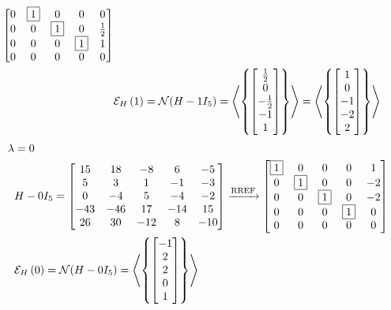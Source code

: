 \documentclass{ximera}
\begin{document}
\begin{example}
\begin{align*}
\begin{bmatrix}
                                          0 & \fbox{1} & 0 & 0 & 0\\
                                          0 & 0 & \fbox{1} & 0 & \frac{1}{2}\\
                                          0 & 0 & 0 & \fbox{1} & 1\\
                                          0 & 0 & 0 & 0 & 0
                                        \end{bmatrix}\\
           &\mathcal{E}_{H}\left(1\right)=\mathcal{N}\!\left(H-1I_5\right)
             =\left\langle\left\{\begin{bmatrix}\frac{1}{2}\\0\\-\frac{1}{2}\\-1\\1\end{bmatrix}\right\}\right\rangle
    =\left\langle\left\{\begin{bmatrix}1\\0\\-1\\-2\\2\end{bmatrix}\right\}\right\rangle
  \end{align*}
  \begin{align*}
    \lambda&=0\\&H-0I_5=
                  \begin{bmatrix}
                    15 & 18 & -8 & 6 & -5\\
                    5 & 3 & 1 & -1 & -3\\
                    0 & -4 & 5 & -4 & -2\\
                    -43 & -46 & 17 & -14 & 15\\
                    26 & 30 & -12 & 8 & -10
                  \end{bmatrix}
                                        \rref
                                        \begin{bmatrix}
                                          \leading{1} & 0 & 0 & 0 & 1\\
                                          0 & \leading{1} & 0 & 0 & -2\\
                                          0 & 0 & \leading{1} & 0 & -2\\
                                          0 & 0 & 0 & \leading{1} & 0\\
                                          0 & 0 & 0 & 0 & 0
                                        \end{bmatrix}\\
           &\eigenspace{H}{0}=\nsp{H-0I_5}
             =\spn{\set{\colvector{-1\\2\\2\\0\\1}}}

\end{align*}
\end{example}
\end{document}
